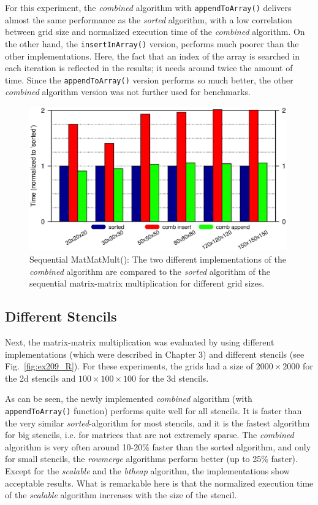For this experiment, the \textit{combined} algorithm with \texttt{appendToArray()} delivers almost the same performance as the \textit{sorted} algorithm, with a low correlation between grid size and normalized execution time of the \textit{combined} algorithm. On the other hand, the \texttt{insertInArray()} version, performs much poorer than the other implementations. Here, the fact that an index of the array is searched in each iteration is reflected in the results; it needs around twice the amount of time. Since the \texttt{appendToArray()} version performs so much better, the other \textit{combined} algorithm version was not further used for benchmarks.

\begin{figure}[tb]
	\centering
	\includegraphics[width=0.99\textwidth, trim={0 2.cm 0 7cm},clip]{seq_insert_append}
	\caption{Sequential MatMatMult(): The two different implementations of the \textit{combined} algorithm are compared to the \textit{sorted} algorithm of the sequential matrix-matrix multiplication for different grid sizes.} 
	\label{fig:ex209_insert_append_3d19p}
\end{figure}

\subsection{Different Stencils}
Next, the matrix-matrix multiplication was evaluated by using different implementations (which were described in Chapter 3) and different stencils (see Fig.~\ref{fig:ex209_R}). For these experiments, the grids had a size of $2000 \times 2000$ for the 2d stencils and $100\times 100 \times 100$ for the 3d stencils. 

As can be seen, the newly implemented \textit{combined} algorithm (with \texttt{appendToArray()} function) performs quite well for all stencils. It is faster than the very similar \textit{sorted}-algorithm for most stencils, and it is the fastest algorithm for big stencils, i.e. for matrices that are not extremely sparse. The \textit{combined} algorithm is very often around 10-20\% faster than the sorted algorithm, and only for small stencils, the \textit{rowmerge} algorithms perform better (up to 25\% faster). Except for the \textit{scalable} and the \textit{btheap} algorithm, the implementations show acceptable results. What is remarkable here is that the normalized execution time of the \textit{scalable} algorithm increases with the size of the stencil.%

